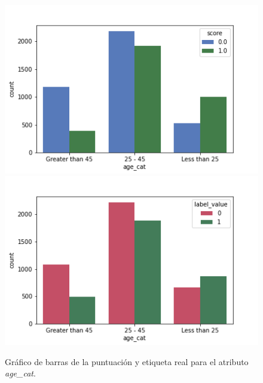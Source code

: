 \begin{figure}[h]
      \includegraphics[width=\linewidth]{images/score_age.png}
    \endminipage\hfill
      \includegraphics[width=\linewidth]{images/label_age.png}
    \endminipage
     \caption{Gráfico de barras de la puntuación y etiqueta real para el atributo \textit{age\_cat}.}
     \label{fig:barrasage}
\end{figure}

